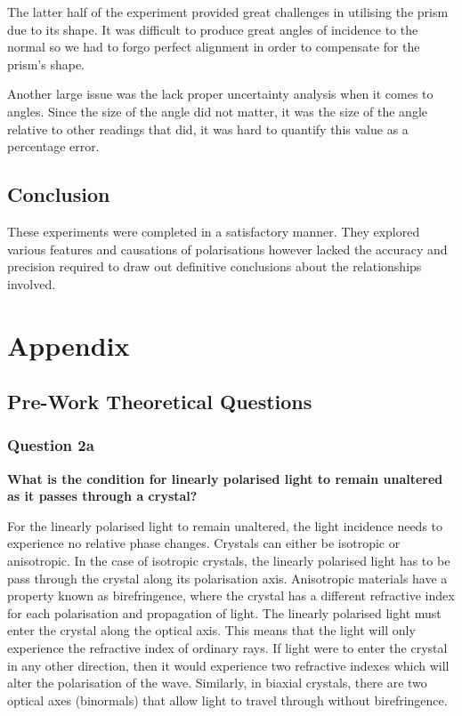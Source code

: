 \documentclass{article}
\begin{document}
The latter half of the experiment provided great challenges in utilising
the prism due to its shape. It was difficult to produce great 
angles of incidence to the normal so we had to forgo perfect alignment 
in order to compensate for the prism's shape.

Another large issue was the lack proper uncertainty analysis when it 
comes to angles. Since the size of the angle did not matter, it was 
the size of the angle relative to other readings that did, it was hard
to quantify this value as a percentage error.

\subsection{Conclusion}
These experiments were completed in a satisfactory manner. They explored
various features and causations of polarisations however lacked the 
accuracy and precision required to draw out definitive conclusions about 
the relationships involved.

\section{Appendix}
\subsection{Pre-Work Theoretical Questions}
\subsubsection{Question 2a}
\textbf{What is the condition for linearly polarised light to 
remain unaltered as it passes through a crystal?}

For the linearly polarised light to remain unaltered, the light 
incidence needs to experience no relative phase changes. Crystals
can either be isotropic or anisotropic. In the case of isotropic 
crystals, the linearly polarised light has to be pass through the 
crystal along its polarisation axis. Anisotropic materials have a 
property known as birefringence, where the crystal has a different
refractive index for each polarisation and propagation of light. 
The linearly polarised light must enter the crystal along the 
optical axis. This means that the light will only experience the
refractive index of ordinary rays. If light were to enter the crystal
in any other direction, then it would experience two refractive indexes
which will alter the polarisation of the wave. Similarly, in biaxial
crystals, there are two optical axes (binormals) that allow light to
travel through without birefringence.
\end{document}
